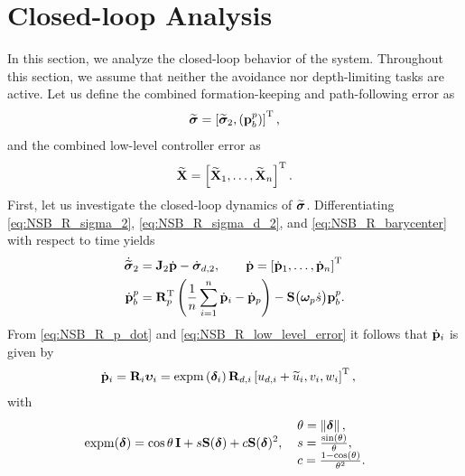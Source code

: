 \section{Closed-loop Analysis}
\label{sec:NSB_R_path_stability}

In this section, we analyze the closed-loop behavior of the system.
Throughout this section, we assume that neither the avoidance nor depth-limiting tasks are active.
Let us define the combined formation-keeping and path-following error as 
\begin{equation}
    \widetilde{\bm{\sigma}} = \left[\widetilde{\bm{\sigma}}_2, \left(\mathbf{p}_b^p\right)\right]^{\mathrm{T}},
\end{equation}
and the combined low-level controller error as
\begin{equation}
    \widetilde{\mathbf{X}} = \left[\widetilde{\mathbf{X}}_1, \ldots, \widetilde{\mathbf{X}}_n\right]^{\mathrm{T}}.
\end{equation}
First, let us investigate the closed-loop dynamics of $\widetilde{\bm{\sigma}}$.
Differentiating \eqref{eq:NSB_R_sigma_2}, \eqref{eq:NSB_R_sigma_d_2}, and \eqref{eq:NSB_R_barycenter} with respect to time yields 
\begin{subequations}
\begin{align}
    \dot{\widetilde{\bm{\sigma}}}_2 &= \mathbf{J}_2\dot{\mathbf{p}} - \dot{\bm{\sigma}}_{d, 2}, \qquad \dot{\mathbf{p}} = \left[\dot{\mathbf{p}}_1, \ldots, \dot{\mathbf{p}}_n\right]^{\mathrm{T}} \\
    \dot{\mathbf{p}}_b^p &= \mathbf{R}_p^{\mathrm{T}}\left(\frac{1}{n}\sum_{i=1}^n\dot{\mathbf{p}}_i - \dot{\mathbf{p}}_p\right) - \mathbf{S}\big(\bm{\omega}_p\dot{s}\big)\mathbf{p}_b^p.
\end{align} \label{eq:NSB_R_dot_sigma_tilde}
\end{subequations}
From \eqref{eq:NSB_R_p_dot} and \eqref{eq:NSB_R_low_level_error} it follows that $\dot{\mathbf{p}}_i$ is given by 
\begin{align}
    \dot{\mathbf{p}}_i &= \mathbf{R}_i\bm{\upsilon}_i = {\rm expm}\left(\bm{\delta}_i\right)\mathbf{R}_{d, i}\left[u_{d, i} + \widetilde{u}_i, v_i, w_i\right]^{\mathrm{T}}, \label{eq:NSB_R_p_dot_closed_loop}
\end{align}
with 
\begin{align}
    {\rm expm}(\bs{\delta}) &= \cos\theta\,\mat{I} + s\mat{S}(\bs{\delta}) + c\mat{S}(\bs{\delta})^2\mathrlap{,} &
    &\begin{array}{l}
    \scale[1]{\theta = \norm{\bs{\delta}},} \\
    \scale[1]{s = \frac{\sin(\theta)}{\theta},} \\
    \scale[1]{c = \frac{1 - \cos(\theta)}{\theta^2}.}
    \end{array} \label{eq:NSB_R_expm}
\end{align}
